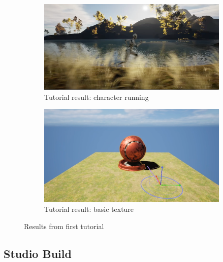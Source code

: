 \documentclass[
  a4paper,  %
  twoside,  %
  bibliography=totoc,
  headsepline,
  cleardoublepage=empty,
  parskip=half,
  draft=false
]{scrbook}
\begin{document}
\begin{figure}[h]
  \begin{subfigure}{0.45\textwidth}
    \includegraphics[width=\linewidth]{graphics/images/unreal-engine/Basics/Landscape-running.png}
    \caption{Tutorial result: character running}
  \end{subfigure}
  \begin{subfigure}{0.45\textwidth}
    \includegraphics[width=\linewidth]{graphics/images/unreal-engine/Basics/Texture.png}
    \caption{Tutorial result: basic texture}
  \end{subfigure}
  \caption{Results from first tutorial}
  \label{fig:ue-basic-tutorial}
\end{figure}

\subsection*{Studio Build}
\end{document}
